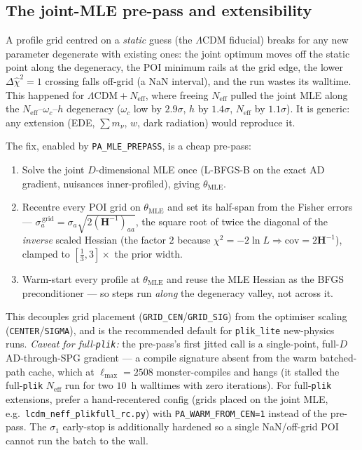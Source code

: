 \documentclass[11pt]{article}
\newcommand{\code}[1]{\texttt{\small #1}}
\newcommand{\Neff}{N_{\mathrm{eff}}}
\newcommand{\chisq}{\chi^2}
\newcommand{\dchisq}{\Delta\hat\chi^2}
\newcommand{\Lmax}{\ell_{\max}}
\begin{document}
\subsection{The joint-MLE pre-pass and extensibility}
\label{sec:mle}

A profile grid centred on a \emph{static} guess (the $\Lambda$CDM
fiducial) breaks for any new parameter degenerate with existing ones: the
joint optimum moves off the static point along the degeneracy, the POI
minimum rails at the grid edge, the lower $\dchisq=1$ crossing falls
off-grid (a NaN interval), and the run wastes its walltime. This happened
for $\Lambda\mathrm{CDM}+\Neff$, where freeing $\Neff$ pulled the joint
MLE along the $\Neff$--$\omega_c$--$h$ degeneracy ($\omega_c$ low by
$2.9\sigma$, $h$ by $1.4\sigma$, $\Neff$ by $1.1\sigma$). It is generic:
any extension (EDE, $\sum m_\nu$, $w$, dark radiation) would reproduce it.

The fix, enabled by \code{PA\_MLE\_PREPASS}, is a cheap pre-pass:
\begin{enumerate}[leftmargin=2em,itemsep=1pt]
\item Solve the joint $D$-dimensional MLE once (L-BFGS-B on the exact AD
gradient, nuisances inner-profiled), giving $\theta_{\mathrm{MLE}}$.
\item Recentre every POI grid on $\theta_{\mathrm{MLE}}$ and set its
half-span from the Fisher errors --- $\sigma_a^{\,\mathrm{grid}}=\sigma_a
\sqrt{2(\bm H^{-1})_{aa}}$, the square root of twice the diagonal of the
\emph{inverse} scaled Hessian (the factor $2$ because
$\chisq=-2\ln L\Rightarrow\mathrm{cov}=2\bm H^{-1}$), clamped to
$[\tfrac13,3]\times$ the prior width.
\item Warm-start every profile at $\theta_{\mathrm{MLE}}$ and reuse the
MLE Hessian as the BFGS preconditioner --- so steps run \emph{along} the
degeneracy valley, not across it.
\end{enumerate}
This decouples grid placement (\code{GRID\_CEN}/\code{GRID\_SIG}) from the
optimiser scaling (\code{CENTER}/\code{SIGMA}), and is the recommended
default for \code{plik\_lite} new-physics runs. \emph{Caveat for
full-\code{plik}:} the pre-pass's first jitted call is a single-point,
full-$D$ AD-through-SPG gradient --- a compile signature absent from the
warm batched-path cache, which at $\Lmax=2508$ monster-compiles and hangs
(it stalled the full-\code{plik} $\Neff$ run for two $10$~h walltimes with
zero iterations). For full-\code{plik} extensions, prefer a hand-recentered
config (grids placed on the joint MLE, e.g.\ \code{lcdm\_neff\_plikfull\_rc.py})
with \code{PA\_WARM\_FROM\_CEN=1} instead of the pre-pass. The $\sigma_1$
early-stop is additionally hardened so a single NaN/off-grid POI cannot run
the batch to the wall.
\end{document}
